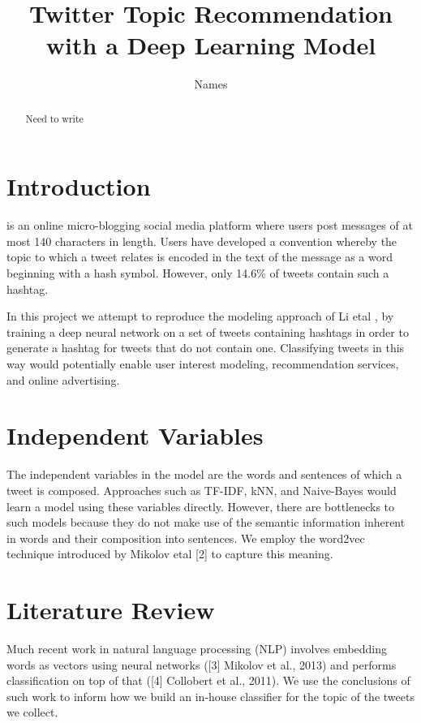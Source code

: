 \documentclass[journal, a4paper]{IEEEtran}
\begin{document}
	\title{Twitter Topic Recommendation with a Deep Learning Model}
	\author{Names}
	\maketitle

\begin{abstract}
Need to write
\end{abstract}

\section{Introduction}
	 is an online micro-blogging social media platform where users post messages of at most 140 characters in length. Users have developed a convention whereby the topic to which a tweet relates is encoded in the text of the message as a word beginning with a hash symbol. However, only 14.6\% of tweets contain such a hashtag.
	
	
	In this project we attempt to reproduce the modeling approach of Li etal \cite{Li-lstm}, by training a deep neural network on a set of tweets containing hashtags in order to generate a hashtag for tweets that do not contain one. Classifying tweets in this way would potentially enable user interest modeling, recommendation services, and online advertising.

\section{Independent Variables}
The independent variables in the model are the words and sentences of which a tweet is composed. Approaches such as TF-IDF, kNN, and Naive-Bayes would learn a model using these variables directly. However, there are bottlenecks to such models because they do not make use of the semantic information inherent in words and their composition into sentences. We employ the word2vec technique introduced by Mikolov etal [2] to capture this meaning.
\section{Literature Review}
	Much recent work in natural language processing (NLP) involves embedding words as vectors using neural networks ([3] Mikolov et al., 2013) and performs classification on top of that ([4] Collobert et al., 2011). We use the conclusions of such work to inform how we build an in-house classifier for the topic of the tweets we collect.
\end{document}
